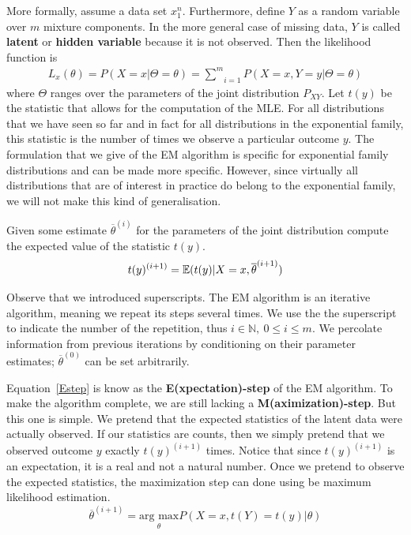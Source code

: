 More formally, assume a data set $ x_{1}^{n} $. Furthermore, define $ Y $ as a random variable over $ m $
mixture components. In the more general case of missing data, $ Y $ is called \textbf{latent} or \textbf{hidden variable}
because it is not observed. Then the likelihood function is
\begin{align}
L_{x}(\theta) = P(X=x|\Theta=\theta) = \underset{i=1}{\overset{m}{\sum}} P(X=x, Y=y|\Theta=\theta)
\end{align}
where $ \Theta $ ranges over the parameters of the joint distribution $ P_{XY} $. Let $ t(y) $ be the
statistic that allows for the computation of the MLE. For all distributions that we have seen so far and in fact for all
distributions in the exponential family, this statistic is the number of times we observe a particular outcome $ y $. The formulation
that we give of the EM algorithm is specific for exponential family distributions and can be made more specific. However, since virtually
all distributions that are of interest in practice do belong to the exponential family, we will not make this kind of generalisation.

Given some estimate $ \overline{\theta}^{(i)} $ for the parameters of the joint
distribution compute the expected value of the statistic $ t(y) $.
\begin{equation} \label{Estep}
t(y)^{(i+1)} = \mathbb{E}(t(y)|X = x,\overline{\theta}^{(i+1)})
\end{equation} 

Observe that we introduced superscripts. The EM algorithm is an iterative algorithm, meaning we repeat its steps several
times. We use the the superscript to indicate the number of the repetition, thus $ i \in \mathbb{N},~ 0 \leq i \leq m $. We percolate
information from previous iterations by conditioning on their parameter estimates; $ \overline{\theta}^{(0)} $ can be set arbitrarily.

Equation~\eqref{Estep} is know as the \textbf{E(xpectation)-step} of the EM algorithm. To make the algorithm complete, we are still lacking a
\textbf{M(aximization)-step}. But this one is simple. We pretend that the expected statistics of the latent data were actually observed. If
our statistics are counts, then we simply pretend that we observed outcome $ y $ exactly $ t(y)^{(i+1)} $ times. Notice that since $ t(y)^{(i+1)} $
is an expectation, it is a real and not a natural number. Once we pretend to observe the expected statistics, the maximization step can done
using be maximum likelihood estimation.
\begin{equation} \label{Mstep}
\overline{\theta}^{(i+1)} = \underset{\theta}{\mbox{arg max}} P(X=x, t(Y) = t(y)|\theta)
\end{equation}

